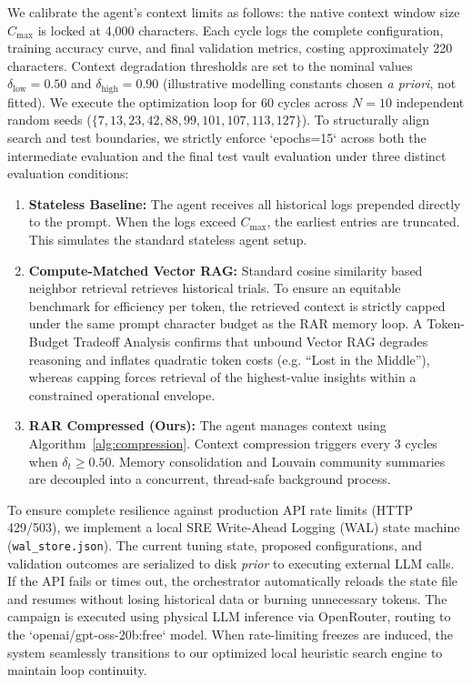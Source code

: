 \documentclass[conference]{IEEEtran}
\newcommand{\dlow}{\delta_{\mathrm{low}}}
\newcommand{\dhigh}{\delta_{\mathrm{high}}}
\newcommand{\Cmax}{C_{\max}}
\begin{document}
We calibrate the agent's context limits as follows: the native context window size $\Cmax$ is locked at 4,000 characters. Each cycle logs the complete configuration, training accuracy curve, and final validation metrics, costing approximately 220 characters. Context degradation thresholds are set to the nominal values $\dlow = 0.50$ and $\dhigh = 0.90$ (illustrative modelling constants chosen \emph{a priori}, not fitted). We execute the optimization loop for 60 cycles across $N=10$ independent random seeds ($\{7, 13, 23, 42, 88, 99, 101, 107, 113, 127\}$). To structurally align search and test boundaries, we strictly enforce `epochs=15` across both the intermediate evaluation and the final test vault evaluation under three distinct evaluation conditions:
\begin{enumerate}[label=\textbf{B\arabic*.},leftmargin=2.2em,itemsep=2pt]
  \item \textbf{Stateless Baseline:} The agent receives all historical logs prepended directly to the prompt. When the logs exceed $\Cmax$, the earliest entries are truncated. This simulates the standard stateless agent setup.
  \item \textbf{Compute-Matched Vector RAG:} Standard cosine similarity based neighbor retrieval retrieves historical trials. To ensure an equitable benchmark for efficiency per token, the retrieved context is strictly capped under the same prompt character budget as the RAR memory loop. A Token-Budget Tradeoff Analysis confirms that unbound Vector RAG degrades reasoning and inflates quadratic token costs (e.g. ``Lost in the Middle''), whereas capping forces retrieval of the highest-value insights within a constrained operational envelope.
  \item \textbf{RAR Compressed (Ours):} The agent manages context using Algorithm~\ref{alg:compression}. Context compression triggers every 3 cycles when $\delta_t \geq 0.50$. Memory consolidation and Louvain community summaries are decoupled into a concurrent, thread-safe background process.
\end{enumerate}

To ensure complete resilience against production API rate limits (HTTP 429/503), we implement a local SRE Write-Ahead Logging (WAL) state machine (\texttt{wal\_store.json}). The current tuning state, proposed configurations, and validation outcomes are serialized to disk \emph{prior} to executing external LLM calls. If the API fails or times out, the orchestrator automatically reloads the state file and resumes without losing historical data or burning unnecessary tokens. The campaign is executed using physical LLM inference via OpenRouter, routing to the `openai/gpt-oss-20b:free` model. When rate-limiting freezes are induced, the system seamlessly transitions to our optimized local heuristic search engine to maintain loop continuity.
\end{document}

